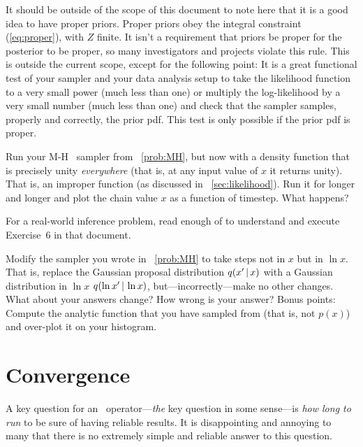 \documentclass[12pt,twoside,pdftex]{article}
\newcommand{\MCMC}{\acronym{MCMC}}
\begin{document}
It should be outside of the scope of this document to note here that
it is a good idea to have proper priors.
Proper priors obey the integral constraint (\ref{eq:proper}),
with $Z$ finite.
It isn't a requirement that priors be proper for the posterior to
be proper, so many investigators and projects violate this rule.
This is outside the current scope, except for the following point:
It is a great functional test of your sampler and your data analysis
setup to take the likelihood function to a very small power (much less
than one) or multiply the log-likelihood by a very small number (much
less than one) and check that the sampler samples, properly and
correctly, the prior pdf.
This test is only possible if the prior pdf is proper.

\begin{problem}
Run your M-H \MCMC\ sampler from \problemname~\ref{prob:MH}, but now
with a density function that is precisely unity \emph{everywhere}
(that is, at any input value of $x$ it returns unity).  That is, an
improper function (as discussed in \sectionname~\ref{sec:likelihood}).
Run it for longer and longer and plot the chain value $x$ as a
function of timestep.  What happens?
\end{problem}

\begin{problem}
For a real-world inference problem, read enough of
\citet{fittingaline} to understand and execute Exercise~6 in that
document.
\end{problem}

\begin{problem}
Modify the sampler you wrote in \problemname~\ref{prob:MH} to take
steps not in $x$ but in $\ln x$.  That is, replace the Gaussian
proposal distribution $q(x'\,|\, x)$ with a Gaussian distribution in
$\ln x$ $q(\ln x'\,|\, \ln x)$, but---incorrectly---make no other
changes.  What about your answers change?  How wrong is your answer?
Bonus points: Compute the analytic function that you have sampled from
(that is, not $p(x)$) and over-plot it on your histogram.
\end{problem}

\section{Convergence}\label{sec:convergence}

A key question for an \MCMC\ operator---\emph{the} key question in some
sense---is \emph{how long to run} to be sure of having reliable
results.
It is disappointing and annoying to many that there is no extremely
simple and reliable answer to this question.
\end{document}

